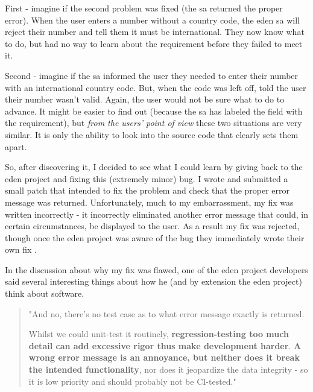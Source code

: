 \documentclass[a4paper,man,natbib,floatsintext]{apa6}
\begin{document}
   First - imagine if the second problem was fixed (the \gls{sa} returned the proper error). When the user enters a number without a country code, the \acrshort{eden} \gls{sa} will reject their number and tell them it must be international. They now know what to do, but had no way to learn about the requirement before they failed to meet it.

   Second - imagine if the \gls{sa} informed the user they needed to enter their number with an international country code. But, when the code was left off, told the user their number wasn't valid. Again, the user would not be sure what to do to advance. It might be easier to find out (because the \gls{sa} has labeled the field with the requirement), but \textit{from the users' point of view} these two situations are very similar. It is only the ability to look into the source code that clearly sets them apart.

   So, after discovering it, I decided to see what I could learn by giving back to the \acrshort{eden} project and fixing this (extremely minor) bug. I wrote and submitted a small patch that intended to fix the problem and check that the proper error message was returned. Unfortunately, much to my embarrassment, my fix was written incorrectly - it incorrectly eliminated another error message that could, in certain circumstances, be displayed to the user. As a result my fix was rejected, though once the \acrshort{eden} project was aware of the bug they immediately wrote their own fix \citep{Konig2020-ey}.

   In the discussion about why my fix was flawed, one of the \acrshort{eden} project developers said several interesting things about how he (and by extension the \acrshort{eden} project) think about software.

   \begin{quote}
   "And no, there's no test case as to what error message exactly is returned.

   Whilst we could unit-test it routinely, \textbf{regression-testing too much detail can add excessive rigor thus make development harder}. \textbf{A wrong error message is an annoyance, but neither does it break the intended functionality}, nor does it jeopardize the data integrity - so it is low priority and should probably not be CI-tested." \citep{Konig2020-yx}
   \end{quote}
\end{document}
